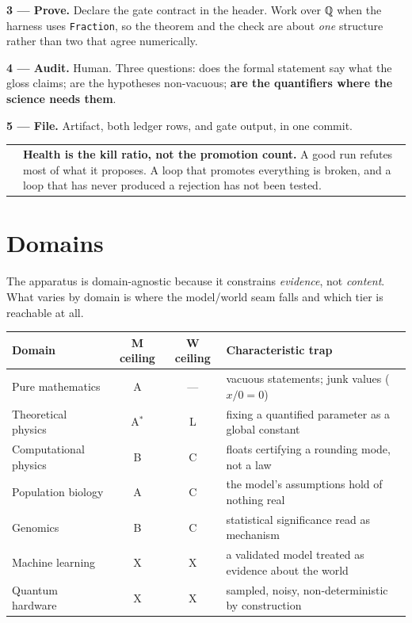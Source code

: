 \documentclass[11pt,a4paper]{article}
\makeatletter
\newcommand{\caveat}[1]{%
  \par\vspace{0.6em}\noindent
  \begin{tabular}{@{}p{0.4em}@{\hspace{0.8em}}p{\dimexpr\linewidth-2.2em\relax}@{}}
  \textcolor{rulegray}{\rule{2pt}{\baselineskip}} & \small #1
  \end{tabular}\par\vspace{0.6em}}
\makeatother
\begin{document}
\textbf{3 — Prove.} Declare the gate contract in the header. Work over ℚ when the harness uses
\texttt{Fraction}, so the theorem and the check are about \emph{one} structure rather than two
that agree numerically.

\textbf{4 — Audit.} Human. Three questions: does the formal statement say what the gloss claims;
are the hypotheses non-vacuous; \textbf{are the quantifiers where the science needs them}.

\textbf{5 — File.} Artifact, both ledger rows, and gate output, in one commit.

\caveat{\textbf{Health is the kill ratio, not the promotion count.} A good run refutes most of
what it proposes. A loop that promotes everything is broken, and a loop that has never produced a
rejection has not been tested.}

\section{Domains}

The apparatus is domain-agnostic because it constrains \emph{evidence}, not \emph{content}. What
varies by domain is where the model/world seam falls and which tier is reachable at all.

\begin{center}\small
\begin{tabular}{@{}lccp{5.4cm}@{}}
\toprule
Domain & \textbf{M} ceiling & \textbf{W} ceiling & Characteristic trap \\
\midrule
Pure mathematics       & \textsf{A} & — & vacuous statements; junk values ($x/0 = 0$) \\
Theoretical physics    & \textsf{A}$^*$ & \textsf{L} & fixing a quantified parameter as a global constant \\
Computational physics  & \textsf{B} & \textsf{C} & floats certifying a rounding mode, not a law \\
Population biology     & \textsf{A} & \textsf{C} & the model's assumptions hold of nothing real \\
Genomics               & \textsf{B} & \textsf{C} & statistical significance read as mechanism \\
Machine learning       & \textsf{X} & \textsf{X} & a validated model treated as evidence about the world \\
Quantum hardware       & \textsf{X} & \textsf{X} & sampled, noisy, non-deterministic by construction \\
\bottomrule
\end{tabular}
\end{center}
\end{document}
